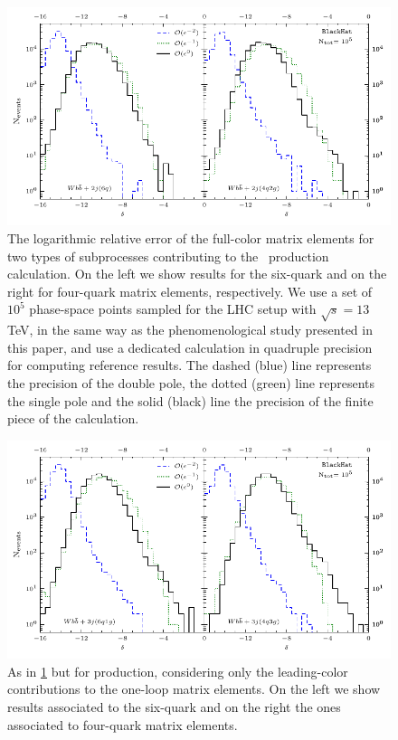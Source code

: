 \begin{figure}[h]
  \centering
  \includegraphics[scale=1.1]{plots/numstab2j}
  \caption{
    The logarithmic relative error of the full-color matrix elements
    for two types of subprocesses contributing to the \Wbbjj~production calculation. On the
    left we show results for the
    six-quark and on the right for four-quark matrix elements, respectively.
    We use a set of $10^5$ phase-space points
    sampled for the LHC setup with $\sqrt{s}=13$ TeV, in the same way as the phenomenological
    study presented in this paper, and use a dedicated calculation in
    quadruple precision for computing reference results.
    The dashed (blue) line represents the precision of the double pole, the dotted
    (green) line represents the single pole and the
  solid (black) line the precision of the finite piece of the calculation.}
  \label{fig:stabilityWbb2j}
\end{figure}
\begin{figure}[h]
  \centering
  \includegraphics[scale=1.1]{plots/numstab3j}
  \caption{As in \cref{fig:stabilityWbb2j} but for \Wbbjjj{} production,
  considering only the leading-color contributions to the one-loop matrix elements.
  On the left we show results associated to the six-quark and on the right the ones associated to
four-quark matrix elements.}
\label{fig:stabilityWbb3j}
\end{figure}

